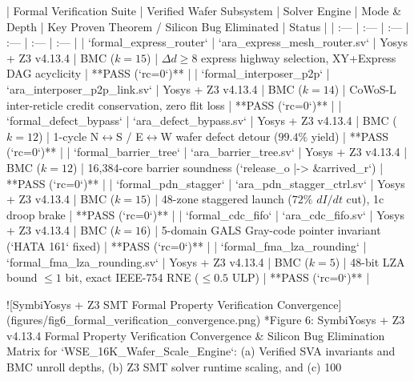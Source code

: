 \documentclass[journal,10pt,twocolumn]{IEEEtran}
\begin{document}
| Formal Verification Suite | Verified Wafer Subsystem | Solver Engine | Mode & Depth | Key Proven Theorem / Silicon Bug Eliminated | Status |
| :--- | :--- | :--- | :--- | :--- | :--- |
| `formal_express_router` | `ara_express_mesh_router.sv` | Yosys + Z3 v4.13.4 | BMC ($k=15$) | $\Delta d \ge 8$ express highway selection, XY+Express DAG acyclicity | **PASS (`rc=0`)** |
| `formal_interposer_p2p` | `ara_interposer_p2p_link.sv` | Yosys + Z3 v4.13.4 | BMC ($k=14$) | CoWoS-L inter-reticle credit conservation, zero flit loss | **PASS (`rc=0`)** |
| `formal_defect_bypass` | `ara_defect_bypass.sv` | Yosys + Z3 v4.13.4 | BMC ($k=12$) | 1-cycle N$\leftrightarrow$S / E$\leftrightarrow$W wafer defect detour ($99.4\%$ yield) | **PASS (`rc=0`)** |
| `formal_barrier_tree` | `ara_barrier_tree.sv` | Yosys + Z3 v4.13.4 | BMC ($k=12$) | 16,384-core barrier soundness (`release_o |-> &arrived_r`) | **PASS (`rc=0`)** |
| `formal_pdn_stagger` | `ara_pdn_stagger_ctrl.sv` | Yosys + Z3 v4.13.4 | BMC ($k=15$) | 48-zone staggered launch ($72\%$ $dI/dt$ cut), 1c droop brake | **PASS (`rc=0`)** |
| `formal_cdc_fifo` | `ara_cdc_fifo.sv` | Yosys + Z3 v4.13.4 | BMC ($k=16$) | 5-domain GALS Gray-code pointer invariant (`HATA 161` fixed) | **PASS (`rc=0`)** |
| `formal_fma_lza_rounding` | `formal_fma_lza_rounding.sv` | Yosys + Z3 v4.13.4 | BMC ($k=5$) | 48-bit LZA bound $\le 1$ bit, exact IEEE-754 RNE ($\le 0.5$ ULP) | **PASS (`rc=0`)** |

![SymbiYosys + Z3 SMT Formal Property Verification Convergence](figures/fig6_formal_verification_convergence.png)
*Figure 6: SymbiYosys + Z3 v4.13.4 Formal Property Verification Convergence & Silicon Bug Elimination Matrix for `WSE_16K_Wafer_Scale_Engine`: (a) Verified SVA invariants and BMC unroll depths, (b) Z3 SMT solver runtime scaling, and (c) 100%
\end{document}
